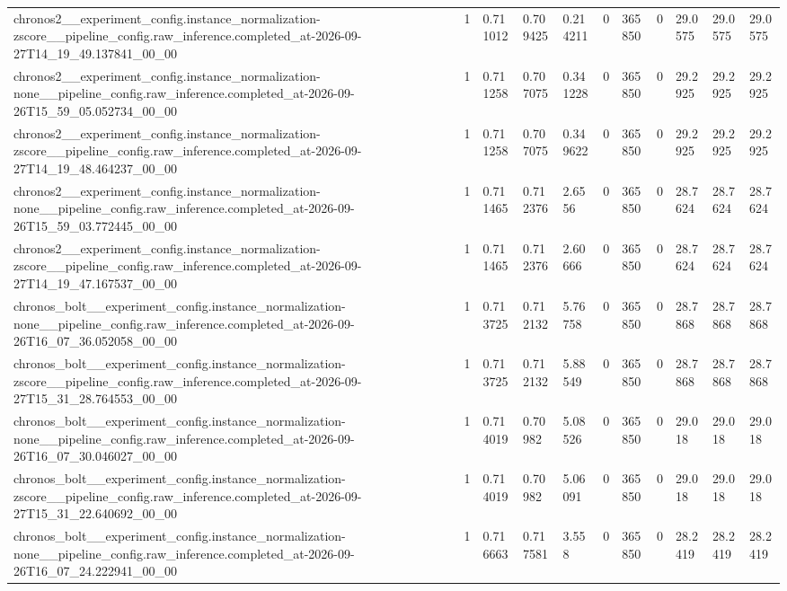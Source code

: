 \begin{tabular}{lllllllllll}
chronos2\_\_experiment\_config.instance\_normalization-zscore\_\_pipeline\_config.raw\_inference.completed\_at-2026-09-27T14\_19\_49.137841\_00\_00 & 1 & 0.711012 & 0.709425 & 0.214211 & 0 & 365850 & 0 & 29.0575 & 29.0575 & 29.0575 \\
chronos2\_\_experiment\_config.instance\_normalization-none\_\_pipeline\_config.raw\_inference.completed\_at-2026-09-26T15\_59\_05.052734\_00\_00 & 1 & 0.711258 & 0.707075 & 0.341228 & 0 & 365850 & 0 & 29.2925 & 29.2925 & 29.2925 \\
chronos2\_\_experiment\_config.instance\_normalization-zscore\_\_pipeline\_config.raw\_inference.completed\_at-2026-09-27T14\_19\_48.464237\_00\_00 & 1 & 0.711258 & 0.707075 & 0.349622 & 0 & 365850 & 0 & 29.2925 & 29.2925 & 29.2925 \\
chronos2\_\_experiment\_config.instance\_normalization-none\_\_pipeline\_config.raw\_inference.completed\_at-2026-09-26T15\_59\_03.772445\_00\_00 & 1 & 0.711465 & 0.712376 & 2.6556 & 0 & 365850 & 0 & 28.7624 & 28.7624 & 28.7624 \\
chronos2\_\_experiment\_config.instance\_normalization-zscore\_\_pipeline\_config.raw\_inference.completed\_at-2026-09-27T14\_19\_47.167537\_00\_00 & 1 & 0.711465 & 0.712376 & 2.60666 & 0 & 365850 & 0 & 28.7624 & 28.7624 & 28.7624 \\
chronos\_bolt\_\_experiment\_config.instance\_normalization-none\_\_pipeline\_config.raw\_inference.completed\_at-2026-09-26T16\_07\_36.052058\_00\_00 & 1 & 0.713725 & 0.712132 & 5.76758 & 0 & 365850 & 0 & 28.7868 & 28.7868 & 28.7868 \\
chronos\_bolt\_\_experiment\_config.instance\_normalization-zscore\_\_pipeline\_config.raw\_inference.completed\_at-2026-09-27T15\_31\_28.764553\_00\_00 & 1 & 0.713725 & 0.712132 & 5.88549 & 0 & 365850 & 0 & 28.7868 & 28.7868 & 28.7868 \\
chronos\_bolt\_\_experiment\_config.instance\_normalization-none\_\_pipeline\_config.raw\_inference.completed\_at-2026-09-26T16\_07\_30.046027\_00\_00 & 1 & 0.714019 & 0.70982 & 5.08526 & 0 & 365850 & 0 & 29.018 & 29.018 & 29.018 \\
chronos\_bolt\_\_experiment\_config.instance\_normalization-zscore\_\_pipeline\_config.raw\_inference.completed\_at-2026-09-27T15\_31\_22.640692\_00\_00 & 1 & 0.714019 & 0.70982 & 5.06091 & 0 & 365850 & 0 & 29.018 & 29.018 & 29.018 \\
chronos\_bolt\_\_experiment\_config.instance\_normalization-none\_\_pipeline\_config.raw\_inference.completed\_at-2026-09-26T16\_07\_24.222941\_00\_00 & 1 & 0.716663 & 0.717581 & 3.558 & 0 & 365850 & 0 & 28.2419 & 28.2419 & 28.2419 \\

\end{tabular}
